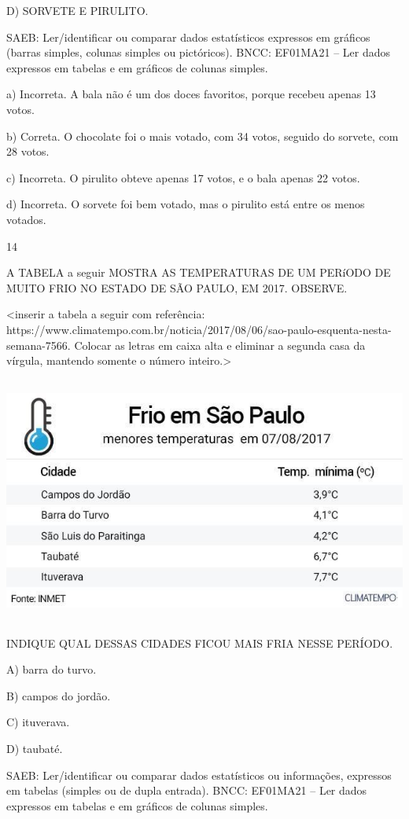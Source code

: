 D) SORVETE E PIRULITO.

SAEB: Ler/identificar ou comparar dados estatísticos expressos
em gráficos (barras simples, colunas simples ou pictóricos).
BNCC: EF01MA21 -- Ler dados expressos em tabelas e em gráficos de colunas
simples.

a) Incorreta. A bala não é um dos doces favoritos, porque recebeu apenas 13 votos.

b) Correta. O chocolate foi o mais votado, com 34 votos, seguido do sorvete, com 28 votos.

c) Incorreta. O pirulito obteve apenas 17 votos, e o bala apenas 22 votos.

d) Incorreta. O sorvete foi bem votado, mas o pirulito está entre os menos votados.

\num{14}

A TABELA a seguir MOSTRA AS TEMPERATURAS DE UM PERíODO DE MUITO FRIO NO ESTADO DE SÃO
PAULO, EM 2017. OBSERVE.

\textless{}inserir a tabela a seguir com referência:
https://www.climatempo.com.br/noticia/2017/08/06/sao-paulo-esquenta-nesta-semana-7566.
Colocar as letras em caixa alta e eliminar a segunda casa da vírgula,
mantendo somente o número inteiro.\textgreater{}

\includegraphics[width=5.90556in,height=3.20208in]{media/image110.jpg}

INDIQUE QUAL DESSAS CIDADES FICOU MAIS FRIA NESSE PERÍODO.

A) barra do turvo.

B) campos do jordão.

C) ituverava.

D) taubaté.

SAEB: Ler/identificar ou comparar dados estatísticos ou
informações, expressos em tabelas (simples ou de dupla entrada).
BNCC: EF01MA21 -- Ler dados expressos em tabelas e em gráficos de colunas
simples.


